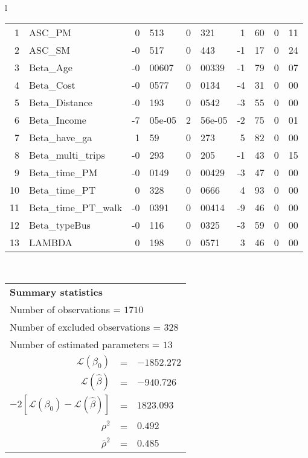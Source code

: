 \begin{tabular}{l}
\begin{tabular}{rlr@{.}lr@{.}lr@{.}lr@{.}l}
1 & ASC_PM  & 0&513 & 0&321 & 1&60 & 0&11\\
2 & ASC_SM & -0&517 & 0&443 & -1&17 & 0&24\\
3 & Beta_Age & -0&00607 & 0&00339 & -1&79 & 0&07\\
4 & Beta_Cost & -0&0577 & 0&0134 & -4&31 & 0&00\\
5 & Beta_Distance & -0&193 & 0&0542 & -3&55 & 0&00\\
6 & Beta_Income & -7&05e-05 & 2&56e-05 & -2&75 & 0&01\\
7 & Beta_have_ga & 1&59 & 0&273 & 5&82 & 0&00\\
8 & Beta_multi_trips & -0&293 & 0&205 & -1&43 & 0&15\\
9 & Beta_time_PM & -0&0149 & 0&00429 & -3&47 & 0&00\\
10 & Beta_time_PT & 0&328 & 0&0666 & 4&93 & 0&00\\
11 & Beta_time_PT_walk & -0&0391 & 0&00414 & -9&46 & 0&00\\
12 & Beta_typeBus & -0&116 & 0&0325 & -3&59 & 0&00\\
13 & LAMBDA & 0&198 & 0&0571 & 3&46 & 0&00\\
\hline
\end{tabular}
\\
\begin{tabular}{rcl}
\multicolumn{3}{l}{\bf Summary statistics}\\
\multicolumn{3}{l}{ Number of observations = $1710$} \\
\multicolumn{3}{l}{ Number of excluded observations = $328$} \\
\multicolumn{3}{l}{ Number of estimated  parameters = $13$} \\
 $\mathcal{L}(\beta_0)$ &=&  $-1852.272$ \\
 $\mathcal{L}(\hat{\beta})$ &=& $-940.726 $  \\
 $-2[\mathcal{L}(\beta_0) -\mathcal{L}(\hat{\beta})]$ &=& $1823.093$ \\
    $\rho^2$ &=&   $0.492$ \\
    $\bar{\rho}^2$ &=&    $0.485$ \\
\end{tabular}
  \end{tabular}
